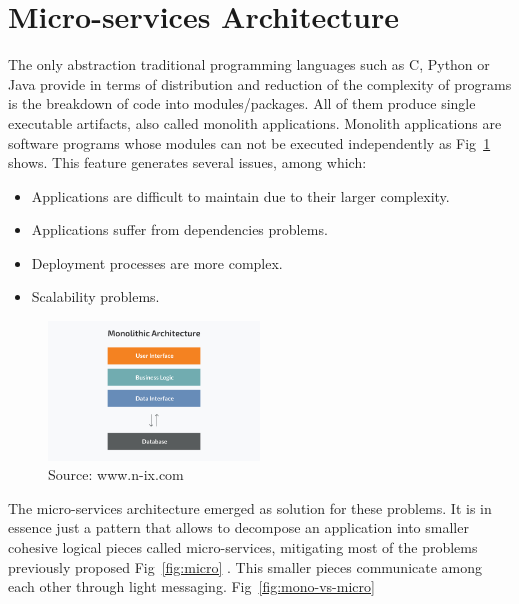 \section{Micro-services Architecture}
\label{Micro-services Architecture}

The only abstraction traditional programming languages such as C, Python or Java provide in terms of distribution and reduction of the complexity of programs is the breakdown of code into modules/packages. All of them produce single executable artifacts, also called monolith applications. Monolith applications are software programs whose modules can not be executed independently as Fig~\ref{fig:mono-app} shows. This feature generates several issues, among which:

\begin{itemize}
    \item Applications are difficult to maintain due to their larger complexity.
    \item Applications suffer from dependencies problems.
    \item Deployment processes are more complex.
    \item Scalability problems.
\end{itemize}

\begin{figure}[H]
    \centering
    \caption{\label{fig:mono-app} Source: www.n-ix.com~\cite{monoVsMicro}}
    \includegraphics[width=0.5\textwidth]{figures/mono.jpg}
\end{figure}

\newpage
The micro-services architecture emerged as solution for these problems. It is in essence just a pattern that allows to decompose an application into smaller cohesive logical pieces called micro-services, mitigating most of the problems previously proposed Fig~\ref{fig:micro} . This smaller pieces communicate among each other through light messaging. Fig~\ref{fig:mono-vs-micro}

